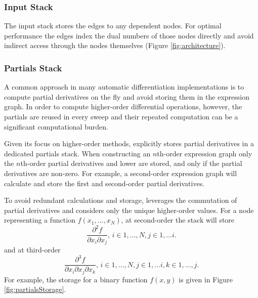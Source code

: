 \subsubsection{Input Stack}

The input stack stores the edges to any dependent nodes.  For
optimal performance the edges index the dual numbers of those
nodes directly and avoid indirect access through the nodes
themselves (Figure \ref{fig:architecture}).

\subsubsection{Partials Stack}

A common approach in many automatic differentiation implementations
is to compute partial derivatives on the fly and avoid storing them in
the expression graph.  In order to compute higher-order differential operations,
however, the partials are reused in every sweep and their repeated computation
can be a significant computational burden.

Given its focus on higher-order methods, \nomad explicitly stores partial 
derivatives in a dedicated partials stack.  When constructing an $n$th-order
expression graph only the $n$th-order partial derivatives and lower are
stored, and only if the partial derivatives are non-zero.  For example, 
a second-order expression graph will calculate and store the first and
second-order partial derivatives.

To avoid redundant calculations and storage, \nomad leverages the commutation
of partial derivatives and considers only the unique higher-order values.  
For a node representing a function $f \! \left( x_{1}, \ldots, x_{N} \right)$, 
at second-order the stack will store
%
\begin{equation*}
\frac{ \partial^{2} f }{ \partial x_{i} \partial x_{j} }, \, i \in 1, \ldots, N, j \in 1, \ldots i.
\end{equation*}
%
and at third-order
%
\begin{equation*}
\frac{ \partial^{3} f }{ \partial x_{i} \partial x_{j} \partial x_{k} }, \, 
i \in 1, \ldots, N, j \in 1, \ldots i, k \in 1, \ldots, j.
\end{equation*}
%
For example, the storage for a binary function $f \! \left(x, y \right)$
is given in Figure \ref{fig:partialsStorage}.

